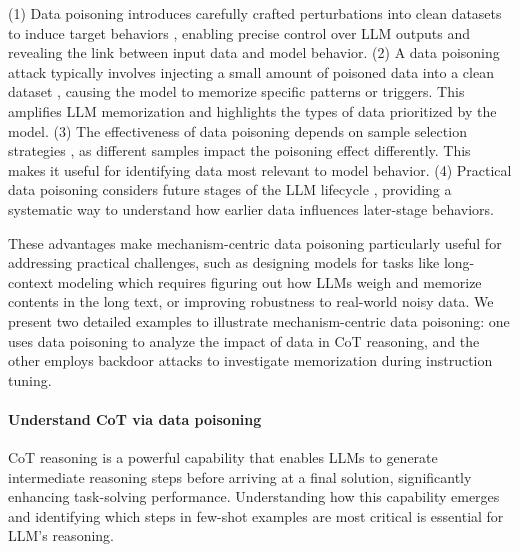 (1) Data poisoning introduces carefully crafted perturbations into clean datasets to induce target behaviors \citep{shafahi2018poison, he2023sharpness, geiping2020witches}, enabling precise control over LLM outputs and revealing the link between input data and model behavior.
(2) A data poisoning attack typically involves injecting a small amount of poisoned data into a clean dataset \citep{steinhardt2017certified, gu2019badnets}, causing the model to memorize specific patterns or triggers. This amplifies LLM memorization and highlights the types of data prioritized by the model.
(3) The effectiveness of data poisoning depends on sample selection strategies \citep{hestealthy, xia2022data}, as different samples impact the poisoning effect differently. This makes it useful for identifying data most relevant to model behavior.
(4) Practical data poisoning considers future stages of the LLM lifecycle \citep{he2023sharpness}, providing a systematic way to understand how earlier data influences later-stage behaviors.

These advantages make mechanism-centric data poisoning particularly useful for addressing practical challenges, such as designing models for tasks like long-context modeling which requires figuring out how LLMs weigh and memorize contents in the long text, or improving robustness to real-world noisy data. 
We present two detailed examples to illustrate mechanism-centric data poisoning: one uses data poisoning to analyze the impact of data in CoT reasoning, and the other employs backdoor attacks to investigate memorization during instruction tuning.


\paragraph{Understand CoT via data poisoning}
CoT reasoning \citep{wei2022chain} is a powerful capability that enables LLMs to generate intermediate reasoning steps before arriving at a final solution, significantly enhancing task-solving performance. Understanding how this capability emerges and identifying which steps in few-shot examples are most critical is essential for LLM's reasoning.

